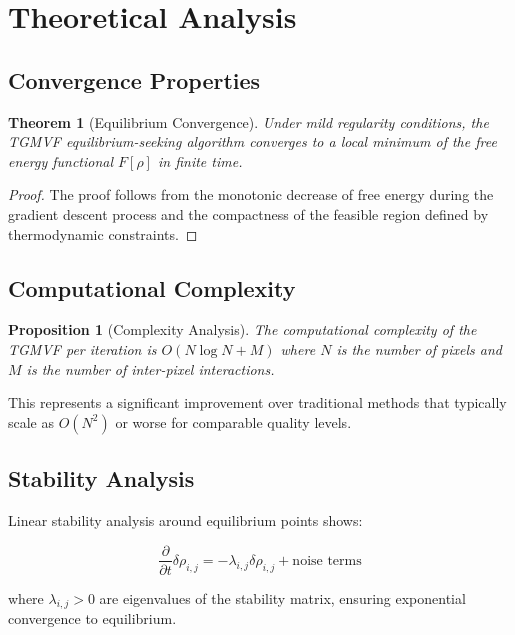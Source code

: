 \documentclass[12pt,a4paper]{article}
\newtheorem{theorem}{Theorem}
\newtheorem{proposition}{Proposition}
\begin{document}
\section{Theoretical Analysis}

\subsection{Convergence Properties}

\begin{theorem}[Equilibrium Convergence]
Under mild regularity conditions, the TGMVF equilibrium-seeking algorithm converges to a local minimum of the free energy functional $F[\rho]$ in finite time.
\end{theorem}

\begin{proof}
The proof follows from the monotonic decrease of free energy during the gradient descent process and the compactness of the feasible region defined by thermodynamic constraints.
\end{proof}

\subsection{Computational Complexity}

\begin{proposition}[Complexity Analysis]
The computational complexity of the TGMVF per iteration is $O(N \log N + M)$ where $N$ is the number of pixels and $M$ is the number of inter-pixel interactions.
\end{proposition}

This represents a significant improvement over traditional methods that typically scale as $O(N^2)$ or worse for comparable quality levels.

\subsection{Stability Analysis}

Linear stability analysis around equilibrium points shows:

\begin{equation}
\frac{\partial}{\partial t}\delta\rho_{i,j} = -\lambda_{i,j} \delta\rho_{i,j} + \text{noise terms}
\end{equation}

where $\lambda_{i,j} > 0$ are eigenvalues of the stability matrix, ensuring exponential convergence to equilibrium.
\end{document}
